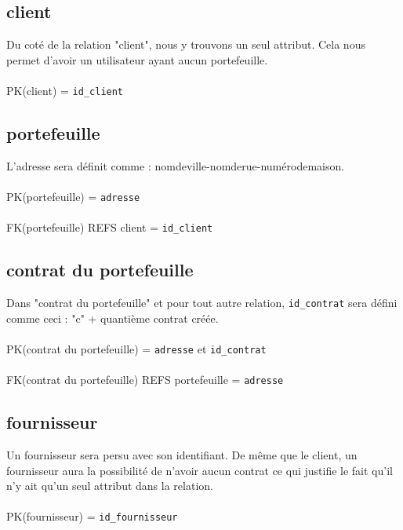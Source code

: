 \subsection{client}
Du coté de la relation "client", nous y trouvons un seul attribut. Cela nous permet d'avoir un utilisateur ayant aucun portefeuille.
\\ \\
PK(client) = \texttt{id\_client}
\subsection{portefeuille}
L'adresse sera définit comme : nomdeville-nomderue-numérodemaison. 
\\ \\
PK(portefeuille) = \texttt{adresse}
\\ \\
FK(portefeuille) REFS client = \texttt{id\_client}
\subsection{contrat du portefeuille}
 Dans "contrat du portefeuille" et pour tout autre relation, \texttt{id\_contrat} sera défini comme ceci : "c" + quantième contrat créée.
\\ \\
PK(contrat du portefeuille) = \texttt{adresse} et \texttt{id\_contrat}
\\ \\
FK(contrat du portefeuille) REFS portefeuille = \texttt{adresse}
\subsection{fournisseur}
Un fournisseur sera persu avec son identifiant. De même que le client, un fournisseur aura la possibilité de n'avoir aucun contrat ce qui justifie le fait qu'il n'y ait qu'un seul attribut dans la relation.
\\ \\
PK(fournisseur) = \texttt{id\_fournisseur}

